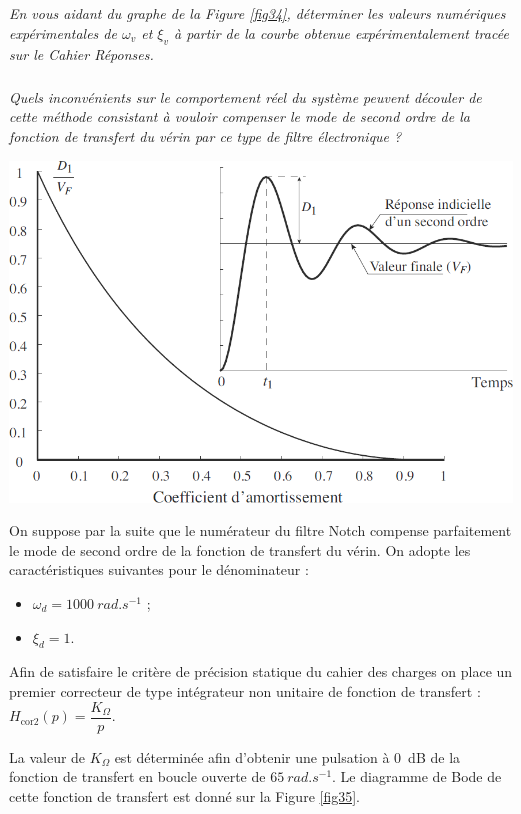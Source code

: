 \begin{multicols}{2}
\begin{multicols}{2}
\subparagraph{}
\textit{En vous aidant du graphe de la Figure \ref{fig34}, déterminer les valeurs numériques expérimentales de $\omega_v$ et $\xi_v$ à partir de la courbe obtenue expérimentalement tracée sur le Cahier Réponses.}
\ifprof
\begin{corrige}
\end{corrige}
\else
\fi

\subparagraph{}
\textit{Quels inconvénients sur le comportement réel du système peuvent découler de cette méthode consistant à vouloir compenser le mode de second ordre de la fonction de transfert du vérin par ce type de filtre électronique ?}
\ifprof
\begin{corrige}
\end{corrige}
\else
\fi


\begin{center}
\includegraphics[width=.6\linewidth]{images/pt_34}
\end{center}
 

On suppose par la suite que le numérateur du filtre Notch compense parfaitement le mode de second ordre de la fonction de transfert du vérin. On adopte les caractéristiques suivantes pour le dénominateur :
\begin{itemize}
\item $\omega_d = \SI{1000}{rad.s^{-1}}$ ;
\item $\xi_d = 1$.
\end{itemize}

Afin de satisfaire le critère de précision statique du cahier des charges on place un premier correcteur de type intégrateur non unitaire de fonction de transfert : $H_{\text{cor2}}(p)=\dfrac{K_{\Omega}}{p}$.

La valeur de $K_{\Omega}$ est déterminée afin d'obtenir une pulsation à \SI{0}{dB} de la fonction de transfert en boucle ouverte de $\SI{65}{rad.s^{-1}}$. Le diagramme de Bode de cette fonction de transfert est donné sur la Figure \ref{fig35}.


\end{multicols}
\end{multicols}
